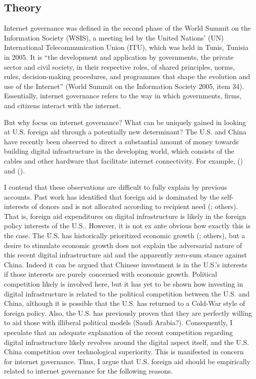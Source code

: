 \subsection{Theory}
Internet governance was defined in the second phase of the World Summit on the Information Society (WSIS), a meeting led by the United Nations' (UN) International Telecommunication Union (ITU), which was held in Tunis, Tunisia in 2005. It is ``the development and application by governments, the private sector and civil society, in their respective roles, of shared principles, norms, rules, decision-making procedures, and programmes that shape the evolution and use of the Internet'' (World Summit on the Information Society 2005, item 34). Essentially, internet governance refers to the way in which governments, firms, and citizens interact with the internet. %

But why focus on internet governance? What can be uniquely gained in looking at U.S. foreign aid through a potentially new determinant? The U.S. and China have recently been observed to direct a substantial amount of money towards building digital infrastructure in the developing world, which consists of the cables and other hardware that facilitate internet connectivity. For example, (\cite{thewhitehouse2022}) and (\cite{shen2022}). 

I contend that these observations are difficult to fully explain by previous accounts. Past work has identified that foreign aid is dominated by the self-interests of donors and is not allocated according to recipient need (\cite{hoeffler2011}; others). That is, foreign aid expenditures on digital infrastructure is likely in the foreign policy interests of the U.S.. However, it is not ex ante obvious how exactly this is the case. The U.S. has historically prioritized economic growth (\cite{dreher2021}; others), but a desire to stimulate economic growth does not explain the adversarial nature of this recent digital infrastructure aid and the apparently zero-sum stance against China. Indeed it can be argued that Chinese investment is in the U.S.'s interests if those interests are purely concerned with economic growth. Political competition likely is involved here, but it has yet to be shown how investing in digital infrastructure is related to the political competition between the U.S. and China, although it is possible that the U.S. has returned to a Cold-War style of foreign policy. Also, the U.S. has previously proven that they are perfectly willing to aid those with illiberal political models (Saudi Arabia?). Consequently, I speculate that an adequate explanation of the recent competition regarding digital infrastructure likely revolves around the digital aspect itself, and the U.S. China competition over technological superiority. This is manifested in concern for internet governance. Thus, I argue that U.S. foreign aid should be empirically related to internet governance for the following reasons.

